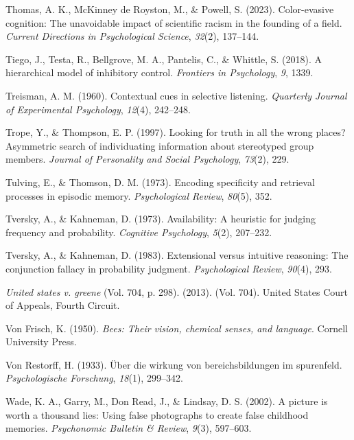 \documentclass[
]{krantz}
\newlength{\cslhangindent}
\newenvironment{CSLReferences}[2] %
 {\begin{list}{}{%
  \setlength{\itemindent}{0pt}
  \setlength{\leftmargin}{0pt}
  \setlength{\parsep}{0pt}
  \ifodd #1
   \setlength{\leftmargin}{\cslhangindent}
   \setlength{\itemindent}{-1\cslhangindent}
  \fi
  \setlength{\itemsep}{#2\baselineskip}}}
 {\end{list}}
\begin{document}
\begin{CSLReferences}{1}{0}
Thomas, A. K., McKinney de Royston, M., \& Powell, S. (2023). Color-evasive cognition: The unavoidable impact of scientific racism in the founding of a field. \emph{Current Directions in Psychological Science}, \emph{32}(2), 137--144.

Tiego, J., Testa, R., Bellgrove, M. A., Pantelis, C., \& Whittle, S. (2018). A hierarchical model of inhibitory control. \emph{Frontiers in Psychology}, \emph{9}, 1339.

Treisman, A. M. (1960). Contextual cues in selective listening. \emph{Quarterly Journal of Experimental Psychology}, \emph{12}(4), 242--248.

Trope, Y., \& Thompson, E. P. (1997). Looking for truth in all the wrong places? Asymmetric search of individuating information about stereotyped group members. \emph{Journal of Personality and Social Psychology}, \emph{73}(2), 229.

Tulving, E., \& Thomson, D. M. (1973). Encoding specificity and retrieval processes in episodic memory. \emph{Psychological Review}, \emph{80}(5), 352.

Tversky, A., \& Kahneman, D. (1973). Availability: A heuristic for judging frequency and probability. \emph{Cognitive Psychology}, \emph{5}(2), 207--232.

Tversky, A., \& Kahneman, D. (1983). Extensional versus intuitive reasoning: The conjunction fallacy in probability judgment. \emph{Psychological Review}, \emph{90}(4), 293.

\emph{United states v. greene} (Vol. 704, p. 298). (2013). (Vol. 704). United States Court of Appeals, Fourth Circuit.

Von Frisch, K. (1950). \emph{Bees: Their vision, chemical senses, and language}. Cornell University Press.

Von Restorff, H. (1933). {Ü}ber die wirkung von bereichsbildungen im spurenfeld. \emph{Psychologische Forschung}, \emph{18}(1), 299--342.

Wade, K. A., Garry, M., Don Read, J., \& Lindsay, D. S. (2002). A picture is worth a thousand lies: Using false photographs to create false childhood memories. \emph{Psychonomic Bulletin \& Review}, \emph{9}(3), 597--603.


\end{CSLReferences}
\end{document}
